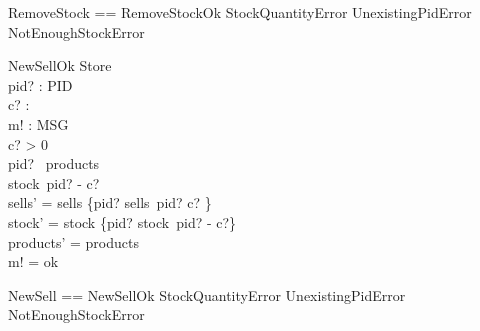 \begin{zed}
RemoveStock == RemoveStockOk \lor StockQuantityError \lor UnexistingPidError \lor NotEnoughStockError
\end{zed}

\begin{schema}{NewSellOk}
\Delta Store \\
pid? : PID \\
c? : \nat \\
m! : MSG \\
\where
c? > 0 \\
pid? \in \dom~products \\
stock~pid? - c? \\
sells' = sells \oplus \{pid? \mapsto sells~pid? \cat \langle c? \rangle\} \\
stock' = stock \oplus \{pid? \mapsto stock~pid? - c?\} \\
products' = products \\
m! = ok
\end{schema}

\begin{zed} 
NewSell == NewSellOk \lor StockQuantityError \lor UnexistingPidError \lor NotEnoughStockError 
\end{zed}